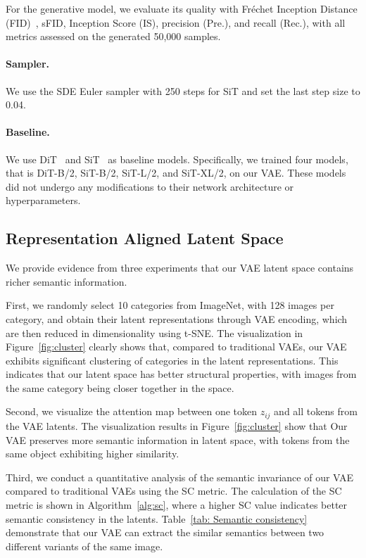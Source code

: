 For the generative model, we evaluate its quality with Fréchet Inception Distance (FID)~\cite{fid}, sFID, Inception Score (IS), precision (Pre.), and recall (Rec.), with all metrics assessed on the generated 50,000 samples.

\paragraph{Sampler.} We use the SDE Euler sampler with 250 steps for SiT and set the last step size to 0.04.

\paragraph{Baseline.} We use DiT~\cite{dit} and SiT~\cite{sit} as baseline models. Specifically, we trained four models, that is DiT-B/2, SiT-B/2, SiT-L/2, and SiT-XL/2, on our VAE. These models did not undergo any modifications to their network architecture or hyperparameters.

\subsection{Representation Aligned Latent Space}

We provide evidence from three experiments that our VAE latent space contains richer semantic information. 

First, we randomly select 10 categories from ImageNet, with 128 images per category, and obtain their latent representations through VAE encoding, which are then reduced in dimensionality using t-SNE. The visualization in Figure~\ref{fig:cluster} clearly shows that, compared to traditional VAEs, our VAE exhibits significant clustering of categories in the latent representations. This indicates that our latent space has better structural properties, with images from the same category being closer together in the space.

Second, we visualize the attention map between one token $z_{ij}$ and all tokens from the VAE latents. The visualization results in Figure~\ref{fig:cluster} show that Our VAE preserves more semantic information in latent space, with tokens from the same object exhibiting higher similarity.

Third, we conduct a quantitative analysis of the semantic invariance of our VAE compared to traditional VAEs using the SC metric. The calculation of the SC metric is shown in Algorithm~\ref{alg:sc}, where a higher SC value indicates better semantic consistency in the latents. Table~\ref{tab: Semantic consistency} demonstrate that our VAE can extract the similar semantics between two different variants of the same image.

